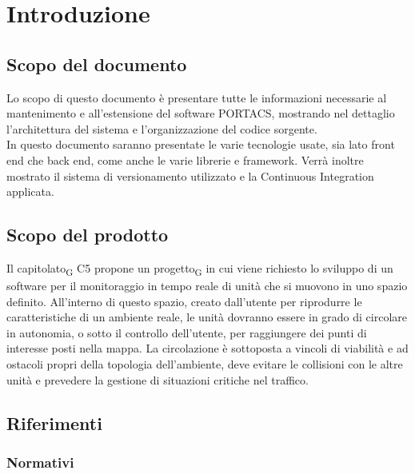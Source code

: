 \section{Introduzione}




\subsection{Scopo del documento}
Lo scopo di questo documento è presentare tutte le informazioni necessarie al mantenimento e all'estensione del software PORTACS, mostrando nel dettaglio l'architettura del sistema e l'organizzazione del codice sorgente.\\
In questo documento saranno presentate le varie tecnologie usate, sia lato front end che back end, come anche le varie librerie e framework. Verrà inoltre mostrato il sistema di versionamento utilizzato e la Continuous Integration applicata.





\subsection{Scopo del prodotto}

Il capitolato\textsubscript{G} C5 propone un progetto\textsubscript{G} in cui viene richiesto lo sviluppo di un software per il monitoraggio in tempo reale di unità che si muovono in uno spazio definito. All'interno di questo spazio, creato dall’utente per riprodurre le caratteristiche di un ambiente reale, le unità dovranno essere in grado di circolare in autonomia, o sotto il controllo dell’utente, per raggiungere dei punti di interesse posti nella mappa.  La circolazione è sottoposta a vincoli di viabilità e ad ostacoli propri della topologia dell’ambiente, deve evitare le collisioni con le altre unità e prevedere la gestione di situazioni critiche nel traffico.




\subsection{Riferimenti}



\subsubsection{Normativi}

